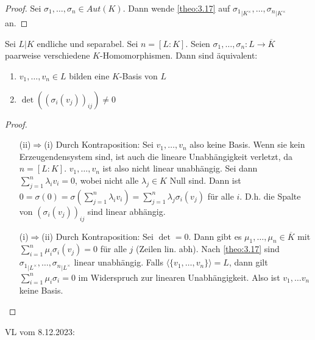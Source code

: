\documentclass[../main.tex]{subfiles}
\begin{document}
\begin{proof}
    Sei $\sigma_1,\dots,\sigma_n\in Aut(K)$.
    Dann wende \cref{theo:3.17} auf ${\sigma_1}_{|K^\times},\dots, {\sigma_n}_{|K^\times}$ an.
\end{proof}
\begin{lemma}\label{theo:3.19}
    Sei $L|K$ endliche und separabel. Sei $n= [L:K]$.
    Seien $\sigma_1,\dots,\sigma_n:L\rightarrow \overline{K}$ paarweise verschiedene $K$-Homomorphismen.
    Dann sind äquivalent:
    \begin{enumerate}[label=(\roman*)]
        \item $v_1,\dots,v_n\in L$ bilden eine $K$-Basis von $L$
        \item $\det\left((\sigma_i(v_j))_{ij}\right)\neq 0$
    \end{enumerate}
\end{lemma}
\begin{proof}$ $
    \begin{itemize}
        \item[(ii)$\Rightarrow$(i)] Durch Kontraposition:
        Sei $v_1,\dots,v_n$ also keine Basis.
        Wenn sie kein Erzeugendensystem sind, ist auch die lineare Unabhängigkeit verletzt, da $n=[L:K]$.
        $v_1,\dots,v_n$ ist also nicht linear unabhängig.
        Sei dann $\sum_{j=1}^n \lambda_i v_i = 0$, wobei nicht alle $\lambda_j\in K$ Null sind.
        Dann ist $0= \sigma(0)= \sigma(\sum_{j=1}^n \lambda_i v_i) = \sum_{j=1}^n \lambda_j \sigma_i(v_j)$ für alle $i$.
        D.h. die Spalte von $(\sigma_i(v_j))_{ij}$ sind linear abhängig.
        \item[(i)$\Rightarrow$(ii)] Durch Kontraposition: Sei $\det = 0$. Dann gibt es $\mu_1,\dots,\mu_n\in \overline{K}$ mit $\sum_{i=1}^n\mu_i \sigma_i(v_j) = 0$ für alle $j$ (Zeilen lin. abh).
        Nach \cref{theo:3.17} sind ${\sigma_1}_{|L^\times},\dots,{\sigma_n}_{|L^\times}$ linear unabhängig.
        Falls $\langle\{v_1,\dots,v_n\}\rangle = L$, dann gilt $\sum_{i=1}^n \mu_i\sigma_i = 0$ im Widerspruch zur linearen Unabhängigkeit.
        Also ist $v_1,\dots v_n$ keine Basis.
    \end{itemize}
\end{proof}

\begin{flushright}
VL vom 8.12.2023:
\end{flushright}
\end{document}

